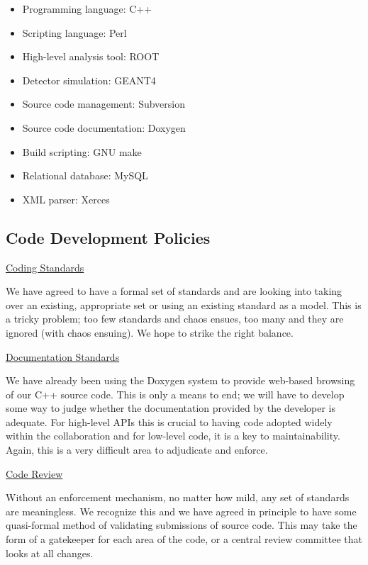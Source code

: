 \begin{itemize}
\item Programming language: C++
\item Scripting language: Perl
\item High-level analysis tool: ROOT
\item Detector simulation: GEANT4
\item Source code management: Subversion
\item Source code documentation: Doxygen
\item Build scripting: GNU make
\item Relational database: MySQL
\item XML parser: Xerces
\end{itemize}

\subsection{Code Development Policies}

\noindent
\underline{Coding Standards}

We have agreed to have a formal set of standards and are looking into taking 
over an existing, appropriate set or using an existing standard as a model. 
This is a tricky problem; too few standards and chaos ensues, too many and 
they are ignored (with chaos ensuing). We hope to strike the right balance.

\vskip 0.3cm

\noindent
\underline{Documentation Standards}

We have already been using the Doxygen system to provide web-based browsing 
of our C++ source code. This is only a means to end; we will have to develop 
some way to judge whether the documentation provided by the developer is 
adequate. For high-level APIs this is crucial to having code adopted widely 
within the collaboration and for low-level code, it is a key to 
maintainability. Again, this is a very difficult area to adjudicate and 
enforce.

\vskip 0.3cm

\noindent
\underline{Code Review}

Without an enforcement mechanism, no matter how mild, any set of standards 
are meaningless. We recognize this and we have agreed in principle to have 
some quasi-formal method of validating submissions of source code. This may 
take the form of a gatekeeper for each area of the code, or a central review 
committee that looks at all changes.

